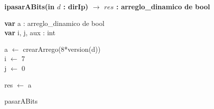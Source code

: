    
   
\textbf{ipasarABits(in $d$ : dirIp) $\longrightarrow$ $res$ : arreglo\_dinamico de bool}

    \incmargin{1em}
    \linesnumbered
    \dontprintsemicolon
    
	\begin{algorithm}[H]
\BlankLine	
	
\textbf{var} a : arreglo\_dinamico de bool\\
\textbf{var} i, j, aux : int	\\

\BlankLine

a $\leftarrow$ crearArrego(8*version(d))\\
i $\leftarrow$ 7\\
j $\leftarrow$ 0\\

\BlankLine

	
res	$\leftarrow$ a
	


 \caption{pasarABits}
   \end{algorithm}
